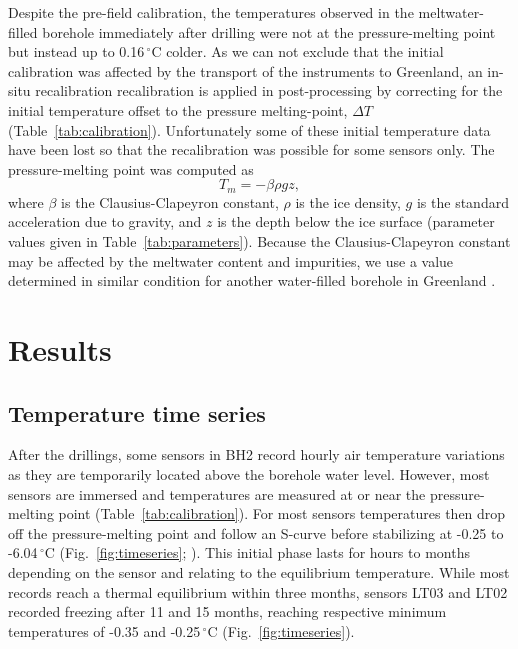 \documentclass[utf8]{article}
\begin{document}
    Despite the pre-field calibration, the temperatures observed in the
    meltwater-filled borehole immediately after drilling were not at the
    pressure-melting point but instead up to 0.16\,$^\circ$C colder.
    As we can not exclude that the initial calibration was affected by the
    transport of the instruments to Greenland, an in-situ recalibration
    recalibration is applied in post-processing by correcting for the initial
    temperature offset to the pressure melting-point, $\Delta
    T$ (Table~\ref{tab:calibration}). Unfortunately some of these initial
    temperature data have been lost so that the recalibration was possible for
    some sensors only. The pressure-melting point was computed as
    \begin{equation}
      T_m = -\beta \rho g z,
    \end{equation}
    where $\beta$ is the Clausius-Clapeyron constant,
    $\rho$ is the ice density, $g$ is the standard
    acceleration due to gravity, and $z$ is the depth below the ice surface
    (parameter values given in Table~\ref{tab:parameters}).
    Because the Clausius-Clapeyron constant may be affected by the meltwater
    content and impurities, we use a value determined in similar condition for
    another water-filled borehole in Greenland \citep[][]{Luthi.etal.2002}.


\section{Results}

\subsection{Temperature time series}

    After the drillings, some sensors in BH2 record hourly air temperature
    variations as they are temporarily located above the borehole water level.
    However, most sensors are immersed and temperatures are measured at or near
    the pressure-melting point (Table~\ref{tab:calibration}). For most sensors
    temperatures then drop off the pressure-melting point and follow an S-curve
    before stabilizing at -0.25 to -6.04\,$^\circ$C
    (Fig.~\ref{fig:timeseries}; \citealp[cf. Fig.~3.6 of][]{Ryser.2014}). This
    initial phase lasts for hours to months
    depending on the sensor and relating to the equilibrium temperature. While
    most records reach a thermal equilibrium within three months, sensors LT03
    and LT02 recorded freezing after 11 and 15 months, reaching respective
    minimum temperatures of -0.35 and -0.25\,$^\circ$C
    (Fig.~\ref{fig:timeseries}).
\end{document}
